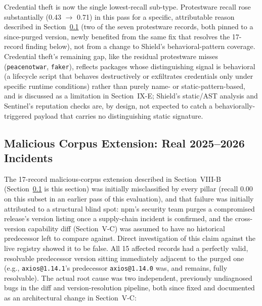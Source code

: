 \documentclass[journal]{IEEEtran}
\begin{document}
Credential theft is now the single lowest-recall sub-type. Protestware recall rose substantially (0.43
$\rightarrow$ 0.71) in this pass for a specific, attributable reason described in
Section~\ref{sec:new-incidents} (two of the seven protestware records, both pinned to a since-purged version,
newly benefited from the same fix that resolves the 17-record finding below), not from a change to Shield's
behavioral-pattern coverage. Credential theft's remaining gap, like the residual protestware misses
(\texttt{peacenotwar}, \texttt{faker}), reflects packages whose distinguishing signal is behavioral (a
lifecycle script that behaves destructively or exfiltrates credentials only under specific runtime
conditions) rather than purely name- or static-pattern-based, and is discussed as a limitation in
Section~IX-E; Shield's static/AST analysis and Sentinel's reputation checks are, by design, not expected to
catch a behaviorally-triggered payload that carries no distinguishing static signature.

\subsection{Malicious Corpus Extension: Real 2025--2026 Incidents}
\label{sec:new-incidents}
The 17-record malicious-corpus extension described in Section~VIII-B (Section~\ref{sec:new-incidents} is this
section) was initially misclassified by every pillar (recall 0.00 on this subset in an earlier pass of this
evaluation), and that failure was initially attributed to a structural blind spot: npm's security team
purges a compromised release's version listing once a supply-chain incident is confirmed, and the
cross-version capability diff (Section~V-C) was assumed to have no historical predecessor left to compare
against. Direct investigation of this claim against the live registry showed it to be false. All 15 affected
records had a perfectly valid, resolvable predecessor version sitting immediately adjacent to the purged one
(e.g., \texttt{axios@1.14.1}'s predecessor \texttt{axios@1.14.0} was, and remains, fully resolvable). The
actual root cause was two independent, previously undiagnosed bugs in the diff and version-resolution
pipeline, both since fixed and documented as an architectural change in Section~V-C:
\end{document}
